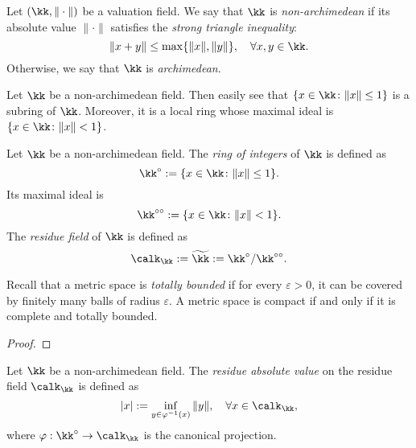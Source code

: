     \begin{definition}\label{def:non-archimedean_fields}
        Let \((\kk,\|\cdot\|)\) be a valuation field.
        We say that \(\kk\) is \emph{non-archimedean} if its absolute value \(\|\cdot\|\) satisfies the \emph{strong triangle inequality}:
        \[ \|x+y\|\leq\max\{\|x\|,\|y\|\},\quad\forall x,y\in\kk. \]
        Otherwise, we say that \(\kk\) is \emph{archimedean}.
    \end{definition}

    Let \(\kk\) be a non-archimedean field.
    Then easily see that \(\{x \in \kk\colon \|x\|\leq 1\}\) is a subring of \(\kk\).
    Moreover, it is a local ring whose maximal ideal is \(\{x \in \kk\colon \|x\| < 1\}\).

    \begin{definition}\label{def:non-archimedean_field_ring_of_integers_maximal_ideal_and_residue_field}
        Let \(\kk\) be a non-archimedean field.
        The \emph{ring of integers} of \(\kk\) is defined as
        \[ \kk^\circ := \{x \in \kk\colon \|x\|\leq 1\}. \]
        Its maximal ideal is
        \[ \kk^{\circ\circ} := \{x \in \kk\colon \|x\| < 1\}. \]
        The \emph{residue field} of \(\kk\) is defined as
        \[ \calk_\kk := \widetilde{\kk} := \kk^\circ / \kk^{\circ\circ}. \]
    \end{definition}


    \begin{lemma}\label{prop:totally_bounded_and_complete_and_compact}
        Recall that a metric space is \emph{totally bounded} if for every \(\varepsilon > 0\), it can be covered by finitely many balls of radius \(\varepsilon\).
        A metric space is compact if and only if it is complete and totally bounded.
    \end{lemma}
    \begin{proof}
    \end{proof}

    \begin{definition}\label{def:residue_absolute_value_on_residue_fields}
        Let \(\kk\) be a non-archimedean field.
        The \emph{residue absolute value} on the residue field \(\calk_\kk\) is defined as
        \[ |x| := \inf_{y \in \varphi^{-1}(x)} \|y\|, \quad \forall x \in \calk_\kk, \]
        where \(\varphi: \kk^\circ \to \calk_\kk\) is the canonical projection.
    \end{definition}


